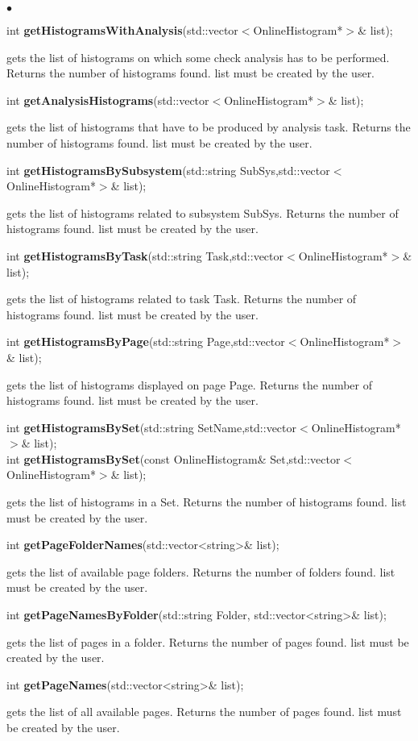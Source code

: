 \documentclass{lhcbnote}
\begin{document}
\begin{list}{$\bullet$}{}
\item int {\bf getHistogramsWithAnalysis}(std::vector$<$OnlineHistogram*$>$\&
list);

gets the list of histograms on which some check analysis has to be
performed. Returns the number of histograms found. list must be
created by the user.

\item int {\bf getAnalysisHistograms}(std::vector$<$OnlineHistogram*$>$\& list);

gets the list of histograms that have to be produced by analysis
task. Returns the number of histograms found. list must be
created by the user.

\item int {\bf getHistogramsBySubsystem}(std::string
SubSys,std::vector$<$OnlineHistogram*$>$\& list);

gets the list of histograms related to subsystem SubSys. Returns the
number of histograms found. list must be created by the user.

\item  int {\bf getHistogramsByTask}(std::string
Task,std::vector$<$OnlineHistogram*$>$\& list);

  gets the list of histograms related to task Task. Returns the
number of histograms found. list must be created by the user.

\item  int {\bf getHistogramsByPage}(std::string Page,std::vector$<$OnlineHistogram*$>$\& list);

  gets the list of histograms displayed on page Page. Returns the
number of histograms found. list must be created by the user.

\item  int {\bf getHistogramsBySet}(std::string SetName,std::vector$<$OnlineHistogram*$>$\& list);\\
int {\bf getHistogramsBySet}(const OnlineHistogram\& Set,std::vector$<$OnlineHistogram*$>$\& list);

  gets the list of histograms in a Set. Returns the
number of histograms found. list must be created by the user.

\item   int {\bf getPageFolderNames}(std::vector<string>\& list);

 gets the list of available page folders. Returns the
number of folders found. list must be created by the user.

\item   int {\bf getPageNamesByFolder}(std::string Folder,
			   std::vector<string>\& list);

  gets the list of pages in a folder. Returns the
number of pages found. list must be created by the user.

\item   int {\bf getPageNames}(std::vector<string>\& list);

gets the list of all available pages. Returns the
number of pages found. list must be created by the user.

\end{list}
\end{document}

